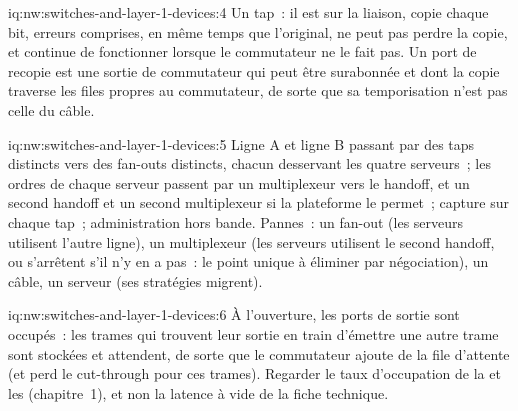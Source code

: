 \begin{solution}{iq:nw:switches-and-layer-1-devices:4}
Un tap~: il est sur la liaison, copie chaque bit, erreurs comprises, en même temps que l'original, ne peut pas perdre la copie, et continue
de fonctionner lorsque le commutateur ne le fait pas. Un port de recopie est une sortie de commutateur qui peut être surabonnée et dont la copie traverse
les files propres au commutateur, de sorte que sa temporisation n'est pas celle du câble.
\end{solution}

\begin{solution}{iq:nw:switches-and-layer-1-devices:5}
Ligne A et ligne B passant par des taps distincts vers des fan-outs distincts, chacun desservant les quatre serveurs~; les ordres de chaque serveur passent par un
multiplexeur vers le handoff, et un second handoff et un second multiplexeur si la plateforme le permet~; capture sur chaque tap~; administration hors bande.
Pannes~: un fan-out (les serveurs utilisent l'autre ligne), un multiplexeur (les serveurs utilisent le second handoff, ou s'arrêtent s'il n'y en a pas~: le
point unique à éliminer par négociation), un câble, un serveur (ses stratégies migrent).
\end{solution}

\begin{solution}{iq:nw:switches-and-layer-1-devices:6}
À l'ouverture, les ports de sortie sont occupés~: les trames qui trouvent leur sortie en train d'émettre une autre trame sont stockées et attendent, de sorte que le commutateur
ajoute de la file d'attente (et perd le cut-through pour ces trames). Regarder le taux d'occupation de la  et les  (chapitre~1), et non
la latence à vide de la fiche technique.
\end{solution}
